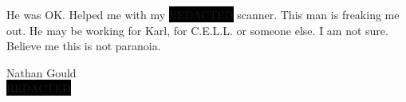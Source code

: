 \documentclass[a5paper,12pt]{letter}
\begin{document}
	\begin{letter}{} %
		
		{\fontsize{13pt}{13.8pt}\selectfont 
			He was OK. Helped me with my \colorbox{black}{REDACTED} scanner. 
			\color{white}This man is freaking me out. He may be working for Karl, for C.E.L.L. or someone else. I am not sure. Believe me this is not paranoia. \color{black} %
		}
		
		\closing{
			\vspace{5ex} %
			{\fontsize{20pt}{16.8pt}\selectfont Nathan Gould} \\[2ex]
			\colorbox{black}{REDACTED} %
		}
	\end{letter}
\end{document}
